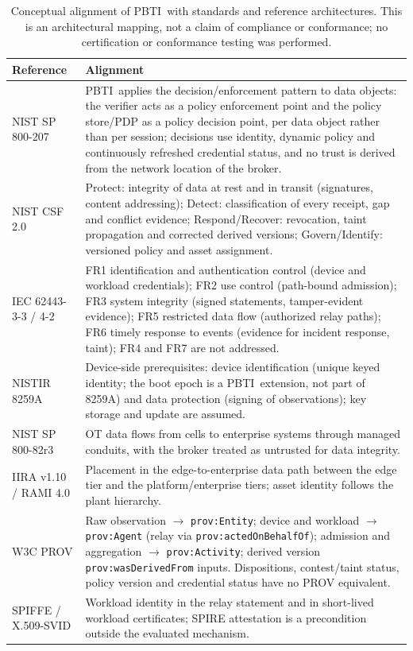 \documentclass[10pt,a4paper]{article}
\newcommand{\sys}{PBTI}
\begin{document}
\begin{table}[!htbp]
\caption{Conceptual alignment of \sys\ with standards and reference architectures. This is an architectural mapping, not a claim of compliance or conformance; no certification or conformance testing was performed.\label{tab:S-standards}}
\footnotesize
\begin{tabularx}{\linewidth}{lX}
\toprule
Reference & Alignment\\
\midrule
NIST SP 800-207 & \sys\ applies the decision/enforcement pattern to data objects: the verifier acts as a policy enforcement point and the policy store/PDP as a policy decision point, per data object rather than per session; decisions use identity, dynamic policy and continuously refreshed credential status, and no trust is derived from the network location of the broker.\\
NIST CSF 2.0 & Protect: integrity of data at rest and in transit (signatures, content addressing); Detect: classification of every receipt, gap and conflict evidence; Respond/Recover: revocation, taint propagation and corrected derived versions; Govern/Identify: versioned policy and asset assignment.\\
IEC 62443-3-3 / 4-2 & FR1 identification and authentication control (device and workload credentials); FR2 use control (path-bound admission); FR3 system integrity (signed statements, tamper-evident evidence); FR5 restricted data flow (authorized relay paths); FR6 timely response to events (evidence for incident response, taint); FR4 and FR7 are not addressed.\\
NISTIR 8259A & Device-side prerequisites: device identification (unique keyed identity; the boot epoch is a \sys\ extension, not part of 8259A) and data protection (signing of observations); key storage and update are assumed.\\
NIST SP 800-82r3 & OT data flows from cells to enterprise systems through managed conduits, with the broker treated as untrusted for data integrity.\\
IIRA v1.10 / RAMI 4.0 & Placement in the edge-to-enterprise data path between the edge tier and the platform/enterprise tiers; asset identity follows the plant hierarchy.\\
W3C PROV & Raw observation $\rightarrow$ \texttt{prov:Entity}; device and workload $\rightarrow$ \texttt{prov:Agent} (relay via \texttt{prov:actedOnBehalfOf}); admission and aggregation $\rightarrow$ \texttt{prov:Activity}; derived version \texttt{prov:wasDerivedFrom} inputs. Dispositions, contest/taint status, policy version and credential status have no PROV equivalent.\\
SPIFFE / X.509-SVID & Workload identity in the relay statement and in short-lived workload certificates; SPIRE attestation is a precondition outside the evaluated mechanism.\\
\bottomrule
\end{tabularx}
\end{table}
\end{document}
